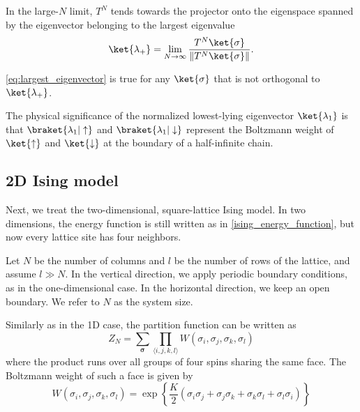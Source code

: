 In the large-$N$ limit, $T^N$ tends towards the projector onto the eigenspace spanned by
the eigenvector belonging to the largest eigenvalue
\begin{equation}\label{eq:largest_eigenvector}
  \ket{\lambda_+} = \lim_{N \to \infty} \frac{T^N \ket{\sigma}}{\left\lVert T^N \ket{\sigma} \right\rVert}.
\end{equation}

\autoref{eq:largest_eigenvector} is true for any $\ket{\sigma}$ that is not orthogonal to $\ket{\lambda_+}$.

The physical significance of the normalized lowest-lying eigenvector $\ket{\lambda_1}$ is
that
$\braket{\lambda_1 | \uparrow}$ and
$\braket{\lambda_1 | \downarrow}$ represent the Boltzmann weight of $\ket{\uparrow}$ and
$\ket{\downarrow}$ at the boundary of a half-infinite chain.

\subsection{2D Ising model}

Next, we treat the two-dimensional, square-lattice Ising model. In two
dimensions, the energy function is still written as in
\autoref{ising_energy_function}, but now every lattice site has four neighbors.

Let $N$ be the number of columns and $l$ be the number of rows of the lattice, and assume
$l \gg N$. In the vertical direction, we apply periodic boundary conditions, as in the
one-dimensional case. In the horizontal direction, we keep an open boundary. We refer to
$N$ as the system size. 

Similarly as in the 1D case, the partition function can be written as
\begin{equation}
  Z_N = \sum_{\bm{\sigma}} \prod_{\langle i, j, k, l \rangle} W(\sigma_i, \sigma_j, \sigma_k, \sigma_l)
\end{equation}
where the product runs over all groups of four spins sharing the same face. The Boltzmann weight of such a face is given by
\begin{equation}\label{eq:boltzmann_weight_face_ising_model}
  W(\sigma_i, \sigma_j, \sigma_k, \sigma_l) = \exp \left\{ \frac{K}{2} (\sigma_i \sigma_j + \sigma_j \sigma_k + \sigma_k \sigma_l + \sigma_l \sigma_i) \right\}
\end{equation}

